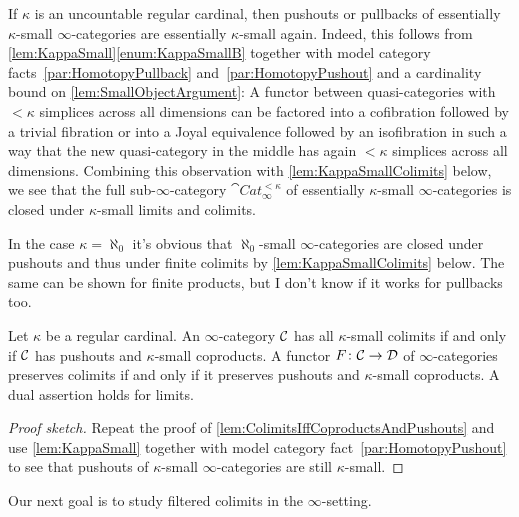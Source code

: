 \begin{rem}\label{rem:KappaSmallClosedUnderPushouts}
	If $\kappa$ is an uncountable regular cardinal, then pushouts or pullbacks of essentially $\kappa$-small $\infty$-categories are essentially $\kappa$-small again. Indeed, this follows from \cref{lem:KappaSmall}\cref{enum:KappaSmallB} together with model category facts~\cref{par:HomotopyPullback} and~\cref{par:HomotopyPushout} and a cardinality bound on \cref{lem:SmallObjectArgument}: A functor between quasi-categories with $<\kappa$ simplices across all dimensions can be factored into a cofibration followed by a trivial fibration or into a Joyal equivalence followed by an isofibration in such a way that the new quasi-category in the middle has again $<\kappa$ simplices across all dimensions. Combining this observation with \cref{lem:KappaSmallColimits} below, we see that the full sub-$\infty$-category $\cat{Cat}_\infty^{<\kappa}$ of essentially $\kappa$-small $\infty$-categories is closed under $\kappa$-small limits and colimits.
	
	In the case $\kappa=\aleph_0$ it's obvious that $\aleph_0$-small $\infty$-categories are closed under pushouts and thus under finite colimits by \cref{lem:KappaSmallColimits} below. The same can be shown for finite products, but I don't know if it works for pullbacks too.
\end{rem}
\begin{lem}\label{lem:KappaSmallColimits}
	Let $\kappa$ be a regular cardinal. An $\infty$-category $\mathcal{C}$ has all $\kappa$-small colimits if and only if $\mathcal{C}$ has pushouts and $\kappa$-small coproducts. A functor $F\colon \mathcal{C}\rightarrow\mathcal{D}$ of $\infty$-categories preserves colimits if and only if it preserves pushouts and $\kappa$-small coproducts. A dual assertion holds for limits.
\end{lem}
\begin{proof}[Proof sketch]
	Repeat the proof of \cref{lem:ColimitsIffCoproductsAndPushouts} and use \cref{lem:KappaSmall} together with model category fact~\cref{par:HomotopyPushout} to see that pushouts of $\kappa$-small $\infty$-categories are still $\kappa$-small.
\end{proof}
Our next goal is to study filtered colimits in the $\infty$-setting. 
